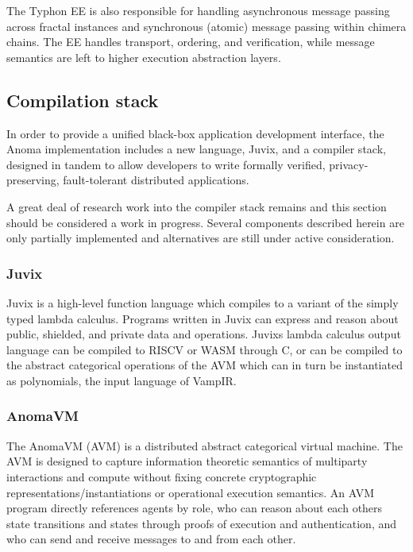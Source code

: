 The Typhon EE is also responsible for handling asynchronous message
passing across fractal instances and synchronous (atomic) message
passing within chimera chains. The EE handles transport, ordering, and
verification, while message semantics are left to higher execution
abstraction layers.

\subsection{Compilation stack}\label{compilation-stack}

In order to provide a unified black-box application development
interface, the Anoma implementation includes a new language, Juvix, and
a compiler stack, designed in tandem to allow developers to write
formally verified, privacy-preserving, fault-tolerant distributed
applications.

A great deal of research work into the compiler stack remains and this
section should be considered a work in progress. Several components
described herein are only partially implemented and alternatives are
still under active consideration.

\subsubsection{Juvix}\label{juvix}

Juvix is a high-level function language which compiles to a variant of
the simply typed lambda calculus. Programs written in Juvix can express
and reason about public, shielded, and private data and operations.
Juvix\textquotesingle s lambda calculus output language can be compiled
to RISCV or WASM through C, or can be compiled to the abstract
categorical operations of the AVM which can in turn be instantiated as
polynomials, the input language of VampIR.

\subsubsection{AnomaVM}\label{anomavm}

The AnomaVM (AVM) is a distributed abstract categorical virtual machine.
The AVM is designed to capture information theoretic semantics of
multiparty interactions and compute without fixing concrete
cryptographic representations/instantiations or operational execution
semantics. An AVM program directly references agents by role, who can
reason about each others state transitions and states through proofs of
execution and authentication, and who can send and receive messages to
and from each other.

